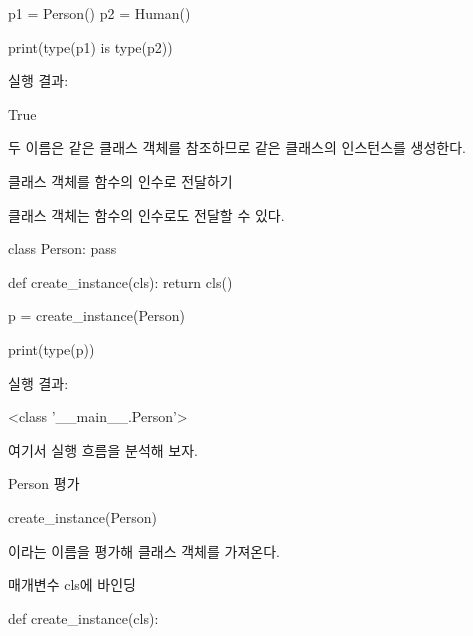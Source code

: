 \begin{dhkcode}
p1 = Person()
p2 = Human()

print(type(p1) is type(p2))
\end{dhkcode}

실행 결과:

\begin{dhkzsh}
True
\end{dhkzsh}

두 이름은 같은 클래스 객체를 참조하므로 같은 클래스의 인스턴스를 생성한다.

\begin{dhknote}
\begin{dhksmry}[centered]
클래스 객체를 함수의 인수로 전달하기
\end{dhksmry}
\end{dhknote}

클래스 객체는 함수의 인수로도 전달할 수 있다.

\begin{dhkcode}
class Person:
    pass

def create_instance(cls):
    return cls()

p = create_instance(Person)

print(type(p))
\end{dhkcode}

실행 결과:

\begin{dhkzsh}
<class '__main__.Person'>
\end{dhkzsh}

여기서 실행 흐름을 분석해 보자.

\begin{dhknote}
\begin{dhksmry}[centered]
Person 평가
\end{dhksmry}
\end{dhknote}

\begin{dhkcode}
create_instance(Person)
\end{dhkcode}

이라는 이름을 평가해 클래스 객체를 가져온다.

\begin{dhknote}
\begin{dhksmry}[centered]
매개변수 cls에 바인딩
\end{dhksmry}
\end{dhknote}

\begin{dhkcode}
def create_instance(cls):
\end{dhkcode}

